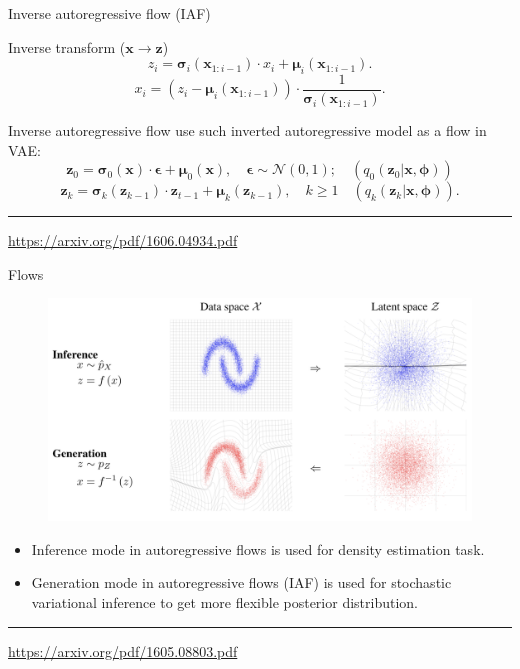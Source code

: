 \documentclass{beamer}
\newcommand{\bx}{\mathbf{x}}
\newcommand{\bz}{\mathbf{z}}
\newcommand{\bepsilon}{\boldsymbol{\epsilon}}
\newcommand{\bmu}{\boldsymbol{\mu}}
\newcommand{\bsigma}{\boldsymbol{\sigma}}
\newcommand{\bphi}{\boldsymbol{\phi}}
\begin{document}
\begin{frame}{Inverse autoregressive flow (IAF)}
	
	\begin{block}{Inverse transform ($\bx \rightarrow \bz$)}
		\vspace{-0.2cm}
		\[
			z_i = \bsigma_i (\bx_{1:i-1}) \cdot x_i + \bmu_i(\bx_{1:i-1}).
		\]
		\[
			x_i = \left( z_i - \bmu_i(\bx_{1:i-1})\right) \cdot \frac{1}{\bsigma_i (\bx_{1:i-1})}.
		\]
		\vspace{-0.3cm}
	\end{block}
	Inverse autoregressive flow use such inverted autoregressive model as a flow in VAE:
	\[
		\bz_0 = \bsigma_0(\bx) \cdot \bepsilon + \bmu_0(\bx), \quad \bepsilon \sim \mathcal{N}(0, 1); \quad (q_0(\bz_0 | \bx, \bphi))
	\]
	\[
		\bz_k = \bsigma_k(\bz_{k - 1}) \cdot \bz_{t-1} + \bmu_k(\bz_{k - 1}), \quad k \geq 1 \quad (q_k(\bz_k | \bx, \bphi)).
	\]
	\vfill
	\hrule\medskip
	{\scriptsize \href{https://arxiv.org/pdf/1606.04934.pdf}{https://arxiv.org/pdf/1606.04934.pdf}} 
\end{frame}
\begin{frame}{Flows}
\begin{figure}
	\includegraphics[width=0.8\linewidth]{figs/flows_how2.png}
\end{figure}
\begin{itemize}	
	\item Inference mode in autoregressive flows is used for density estimation task.
	\item Generation mode in autoregressive flows (IAF) is used for stochastic variational inference to get more flexible posterior distribution.
\end{itemize}
\vfill
\hrule\medskip
{\scriptsize \href{https://arxiv.org/pdf/1605.08803.pdf}{https://arxiv.org/pdf/1605.08803.pdf}} 
\end{frame}
\end{document}
